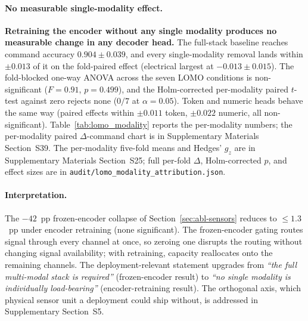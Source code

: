 \documentclass[sensors,article,submit,moreauthors,pdftex]{Definitions/mdpi}
\begin{document}
\paragraph{No measurable single-modality effect.} \textbf{Retraining the encoder without any single modality produces no measurable change in any decoder head.} The full-stack baseline reaches command accuracy $0.904 \pm 0.039$, and every single-modality removal lands within $\pm 0.013$ of it on the fold-paired effect (electrical largest at $-0.013 \pm 0.015$). The fold-blocked one-way ANOVA across the seven LOMO conditions is non-significant ($F=0.91$, $p=0.499$), and the Holm-corrected per-modality paired $t$-test against zero rejects none ($0/7$ at $\alpha=0.05$). Token and numeric heads behave the same way (paired effects within $\pm 0.011$ token, $\pm 0.022$ numeric, all non-significant). Table~\ref{tab:lomo_modality} reports the per-modality numbers; the per-modality paired $\Delta$-command chart is in Supplementary Materials Section~S39. The per-modality five-fold means and Hedges' $g_z$ are in Supplementary Materials Section~S25; full per-fold $\Delta$, Holm-corrected $p$, and effect sizes are in \texttt{audit/lomo\_modality\_attribution.json}.



\paragraph{Interpretation.} The $-42$~pp frozen-encoder collapse of Section~\ref{sec:abl-sensors} reduces to $\le\!1.3$~pp under encoder retraining (none significant). The frozen-encoder gating routes signal through every channel at once, so zeroing one disrupts the routing without changing signal availability; with retraining, capacity reallocates onto the remaining channels. The deployment-relevant statement upgrades from \emph{``the full multi-modal stack is required''} (frozen-encoder result) to \emph{``no single modality is individually load-bearing''} (encoder-retraining result). The orthogonal axis, which physical sensor unit a deployment could ship without, is addressed in Supplementary Section~S5.
\end{document}
